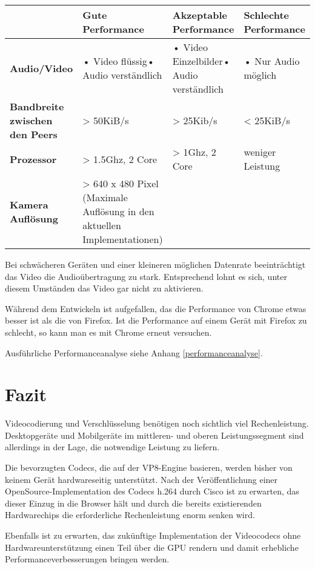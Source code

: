 		\noindent
		\begin{tabularx}{\linewidth}{|X|X|X|X|}
			\hline
			& \textbf{Gute Performance} & \textbf{Akzeptable Performance} & \textbf{Schlechte Performance} \\
			\hline
			\textbf{Audio/Video} & • Video flüssig\newline• Audio verständlich & • Video Einzelbilder\newline• Audio verständlich & • Nur Audio möglich\\
			\hline
			\textbf{Bandbreite zwischen den Peers} &> 50KiB/s &> 25Kib/s &< 25KiB/s \\
			\hline
			\textbf{Prozessor} &> 1.5Ghz, 2 Core &> 1Ghz, 2 Core &weniger Leistung \\
			\hline
			\textbf{Kamera Auflösung} &> 640 x 480 Pixel (Maximale Auflösung in den aktuellen Implementationen) & & \\
			\hline
		\end{tabularx}
		
		\vspace{0.5cm}
		Bei schwächeren Geräten und einer kleineren möglichen Datenrate beeinträchtigt das Video die Audioübertragung zu stark. Entsprechend lohnt es sich, unter diesem Umständen das Video gar nicht zu aktivieren.
		
		Während dem Entwickeln ist aufgefallen, das die Performance von Chrome etwas besser ist als die von Firefox. Ist die Performance auf einem Gerät mit Firefox zu schlecht, so kann man es mit Chrome erneut versuchen.
			
		Ausführliche Performanceanalyse siehe Anhang \ref{performanceanalyse}.
	
	
	\section{Fazit}
		Videocodierung und Verschlüsselung benötigen noch sichtlich viel Rechenleistung. Desktopgeräte und Mobilgeräte im mittleren- und oberen Leistungssegment sind allerdings in der Lage, die notwendige Leistung zu liefern.
		
		Die bevorzugten Codecs, die auf der VP8-Engine basieren, werden bisher von keinem Gerät hardwareseitig unterstützt. Nach der Veröffentlichung einer OpenSource-Implementation des Codecs h.264 durch Cisco ist zu erwarten, das dieser Einzug in die Browser hält und durch die bereits existierenden Hardwarechips die erforderliche Rechenleistung enorm senken wird.
			
		Ebenfalls ist zu erwarten, das zukünftige Implementation der Videocodecs ohne Hardwareunterstützung einen Teil über die GPU rendern und damit erhebliche Performanceverbesserungen bringen werden.
			
